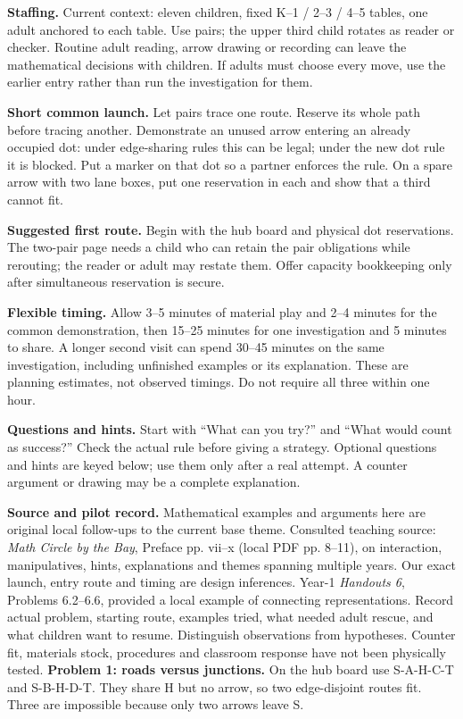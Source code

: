 \documentclass[11pt]{article}
\begin{document}
\textbf{Staffing.} Current context: eleven children, fixed K--1 / 2--3 / 4--5 tables, one adult anchored to each table. Use pairs; the upper third child rotates as reader or checker. Routine adult reading, arrow drawing or recording can leave the mathematical decisions with children. If adults must choose every move, use the earlier entry rather than run the investigation for them.

\textbf{Short common launch.} Let pairs trace one route. Reserve its whole path before tracing another. Demonstrate an unused arrow entering an already occupied dot: under edge-sharing rules this can be legal; under the new dot rule it is blocked. Put a marker on that dot so a partner enforces the rule. On a spare arrow with two lane boxes, put one reservation in each and show that a third cannot fit.

\textbf{Suggested first route.} Begin with the hub board and physical dot reservations. The two-pair page needs a child who can retain the pair obligations while rerouting; the reader or adult may restate them. Offer capacity bookkeeping only after simultaneous reservation is secure.

\textbf{Flexible timing.} Allow 3--5 minutes of material play and 2--4 minutes for the common demonstration, then 15--25 minutes for one investigation and 5 minutes to share. A longer second visit can spend 30--45 minutes on the same investigation, including unfinished examples or its explanation. These are planning estimates, not observed timings. Do not require all three within one hour.

\textbf{Questions and hints.} Start with ``What can you try?'' and ``What would count as success?'' Check the actual rule before giving a strategy. Optional questions and hints are keyed below; use them only after a real attempt. A counter argument or drawing may be a complete explanation.

\textbf{Source and pilot record.} Mathematical examples and arguments here are original local follow-ups to the current base theme. Consulted teaching source: \emph{Math Circle by the Bay}, Preface pp. vii--x (local PDF pp. 8--11), on interaction, manipulatives, hints, explanations and themes spanning multiple years. Our exact launch, entry route and timing are design inferences. Year-1 \emph{Handouts 6}, Problems 6.2--6.6, provided a local example of connecting representations. Record actual problem, starting route, examples tried, what needed adult rescue, and what children want to resume. Distinguish observations from hypotheses. Counter fit, materials stock, procedures and classroom response have not been physically tested.
\newpage
\textbf{Problem 1: roads versus junctions.} On the hub board use S-A-H-C-T and S-B-H-D-T. They share H but no arrow, so two edge-disjoint routes fit. Three are impossible because only two arrows leave S.
\end{document}
